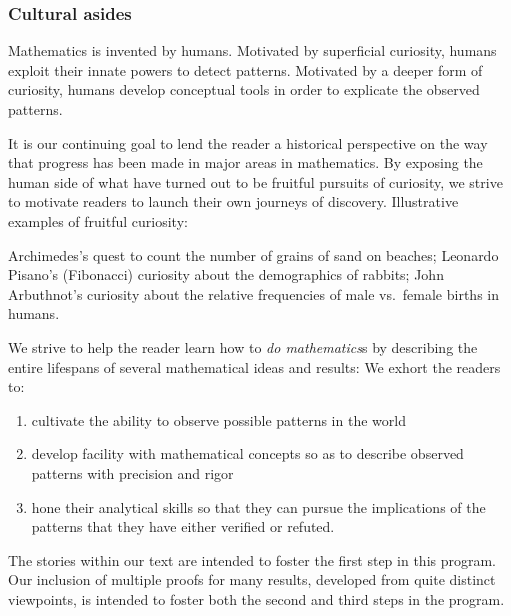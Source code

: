
\subsubsection{Cultural asides}

Mathematics is invented by humans.  Motivated by superficial curiosity, humans exploit their innate powers to detect patterns.  Motivated by a deeper form of curiosity, humans develop conceptual tools in order to explicate the observed patterns.

\smallskip

It is our continuing goal to lend the reader a historical perspective on the way that progress has been made in major areas in mathematics.  By exposing the human side of what have turned out to be fruitful pursuits of curiosity, we strive to motivate readers to launch their own journeys of discovery.  Illustrative examples of fruitful curiosity:

Archimedes's quest to count the number of grains of sand on beaches; Leonardo Pisano's (Fibonacci) curiosity about the demographics of rabbits; John Arbuthnot's curiosity about the relative frequencies of male vs.~female births in humans. 

\smallskip

We strive to help the reader learn how to {\em do mathematics}s by describing the entire lifespans of several mathematical ideas and results:  We exhort the readers to:
\begin{enumerate}
\item
cultivate the ability to observe possible patterns in the world
\item
develop facility with mathematical concepts so as to describe observed patterns with precision and rigor
\item
hone their analytical skills so that they can pursue the implications of the patterns that they have either verified or refuted.
\end{enumerate}

\medskip

The stories within our text are intended to foster the first step in this program.  Our inclusion of  multiple proofs for many results, developed from quite distinct viewpoints, is intended to foster both the second and third steps in the program. 

